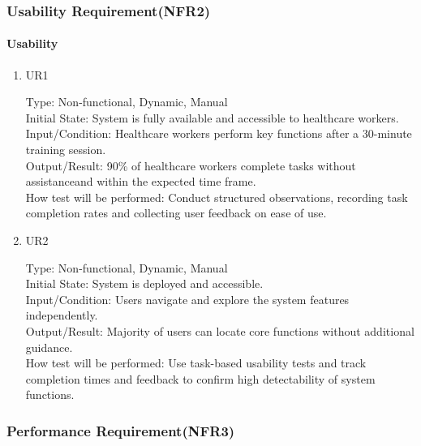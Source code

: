 \documentclass[12pt, titlepage]{article}
\begin{document}
\subsubsection{Usability Requirement(NFR2)}

\paragraph{Usability}

\begin{enumerate}
    \item{UR1\\}
    
    Type: Non-functional, Dynamic, Manual\\
    
    Initial State: System is fully available and accessible to healthcare workers.\\
    
    Input/Condition: Healthcare workers perform key functions after a 30-minute training session.\\
    
    Output/Result: 90\% of healthcare workers complete tasks without assistanceand within the expected time frame.\\
    
    How test will be performed: Conduct structured observations, recording task completion rates and collecting user feedback on ease of use.

    \item{UR2\\}
    
    Type: Non-functional, Dynamic, Manual\\
    
    Initial State: System is deployed and accessible.\\
    
    Input/Condition: Users navigate and explore the system features independently.\\
    
    Output/Result: Majority of users can locate core functions without additional guidance.\\
    
    How test will be performed: Use task-based usability tests and track completion times and feedback to confirm high detectability of system functions.
\end{enumerate}

\subsubsection{Performance Requirement(NFR3)}
\end{document}
